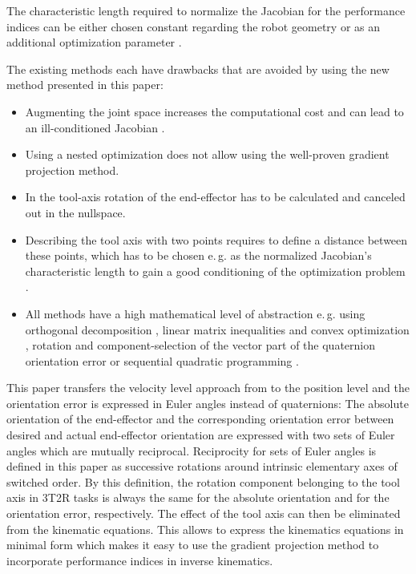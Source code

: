 \documentclass[twocolumn,10pt]{IFTOMM}
\begin{document}
The characteristic length required to normalize the Jacobian for the performance indices can be either chosen constant regarding the robot geometry \cite{ZhuQuCaoYan2013} or as an additional optimization parameter \cite{LegerAng2016}.

The existing methods each have drawbacks that are avoided by using the new method presented in this paper:
\begin{itemize}
    \item Augmenting the joint space \cite{Baron2000} increases the computational cost and can lead to an ill-conditioned Jacobian \cite{HuoBar2008}.
    \item Using a nested optimization \cite{ZhuQuCaoYan2013,GuoDonKe2015} does not allow using the well-proven gradient projection method.
    \item In \cite{Zlajpah2017} the tool-axis rotation of the end-effector has to be calculated and canceled out in the nullspace.
    \item Describing the tool axis with two points requires to define a distance between these points, which has to be chosen e.\,g. as the normalized Jacobian's characteristic length to gain a good conditioning of the optimization problem \cite{LegerAng2016}.
    \item All methods have a high mathematical level of abstraction e.\,g. using orthogonal decomposition \cite{HuoBar2008}, linear matrix inequalities and convex optimization \cite{FromGra2010}, rotation and component-selection of the vector part of the quaternion orientation error \cite{Zlajpah2017} or sequential quadratic programming \cite{LegerAng2016}.
\end{itemize}

This paper transfers the velocity level approach from \cite{Zlajpah2017} to the position level and the orientation error is expressed in Euler angles instead of quaternions:
%
The absolute orientation of the end-effector and the corresponding orientation error between desired and actual end-effector orientation are expressed with two sets of Euler angles which are mutually reciprocal.
Reciprocity for sets of Euler angles is defined in this paper as successive rotations around intrinsic elementary axes of switched order.
By this definition, the rotation component belonging to the tool axis in 3T2R tasks is always the same for the absolute orientation and for the orientation error, respectively.
The effect of the tool axis can then be eliminated from the kinematic equations.
This allows to express the kinematics equations in minimal form which makes it easy to use the gradient projection method to incorporate performance indices in inverse kinematics.
\end{document}
